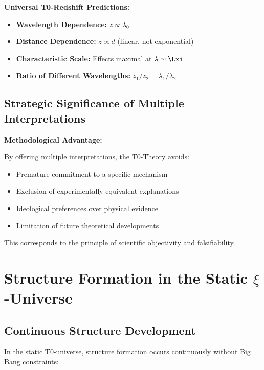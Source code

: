 	\begin{keyresult}
		\textbf{Universal T0-Redshift Predictions:}
		
		\begin{itemize}
			\item \textbf{Wavelength Dependence:} $z \propto \lambda_0$
			\item \textbf{Distance Dependence:} $z \propto d$ (linear, not exponential)
			\item \textbf{Characteristic Scale:} Effects maximal at $\lambda \sim \Lxi$
			\item \textbf{Ratio of Different Wavelengths:} $z_1/z_2 = \lambda_1/\lambda_2$
		\end{itemize}
	\end{keyresult}
	
	\subsection{Strategic Significance of Multiple Interpretations}
	
	\begin{warning}
		\textbf{Methodological Advantage:}
		
		By offering multiple interpretations, the T0-Theory avoids:
		\begin{itemize}
			\item Premature commitment to a specific mechanism
			\item Exclusion of experimentally equivalent explanations
			\item Ideological preferences over physical evidence
			\item Limitation of future theoretical developments
		\end{itemize}
		
		This corresponds to the principle of scientific objectivity and falsifiability.
	\end{warning}	
	\section{Structure Formation in the Static $\xi$-Universe}
	
	\subsection{Continuous Structure Development}
	
	In the static T0-universe, structure formation occurs continuously without Big Bang constraints:
	

